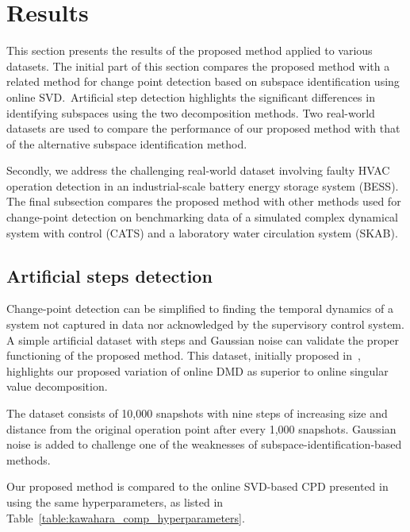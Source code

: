 \section{Results}\label{sec:results}

This section presents the results of the proposed method applied to various datasets. The initial part of this section compares the proposed method with a related method for change point detection based on subspace identification using online SVD.~Artificial step detection highlights the significant differences in identifying subspaces using the two decomposition methods. Two real-world datasets are used to compare the performance of our proposed method with that of the alternative subspace identification method.

Secondly, we address the challenging real-world dataset involving faulty HVAC operation detection in an industrial-scale battery energy storage system (BESS). The final subsection compares the proposed method with other methods used for change-point detection on benchmarking data of a simulated complex dynamical system with control (CATS) and a laboratory water circulation system (SKAB).

\subsection{Artificial steps detection}
Change-point detection can be simplified to finding the temporal dynamics of a system not captured in data nor acknowledged by the supervisory control system. A simple artificial dataset with steps and Gaussian noise can validate the proper functioning of the proposed method. This dataset, initially proposed in~\citet{Kawahara2007}, highlights our proposed variation of online DMD as superior to online singular value decomposition.

The dataset consists of 10,000 snapshots with nine steps of increasing size and distance from the original operation point after every 1,000 snapshots. Gaussian noise is added to challenge one of the weaknesses of subspace-identification-based methods.

Our proposed method is compared to the online SVD-based CPD presented in~\cite{Kawahara2007} using the same hyperparameters, as listed in Table~\ref{table:kawahara_comp_hyperparameters}.

